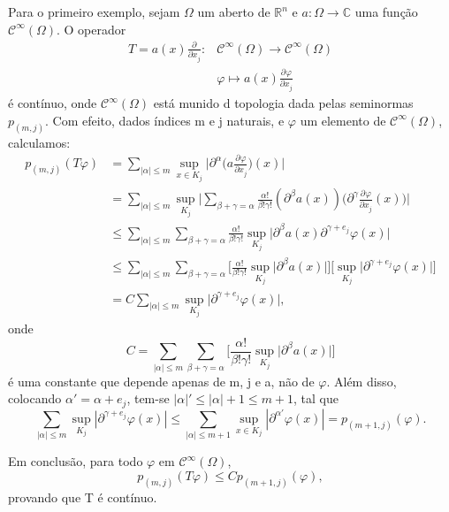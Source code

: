 \documentclass[../distribution_theory_notes.tex]{subfiles}
\begin{document}
\begin{example}
	Para o primeiro exemplo, sejam \(\Omega \) um aberto de \(\mathbb{R}^{n}\) e \(a:\Omega \rightarrow \mathbb{C}\) uma função \(\mathcal{C}^{\infty}(\Omega )\). O operador
	\begin{align*}
		T=a(x)\frac{\partial^{}}{\partial x_{j}^{}}: & \mathcal{C}^{\infty}(\Omega )\rightarrow \mathcal{C}^{\infty}(\Omega ) \\
		                                             & \varphi \mapsto a(x)\frac{\partial^{}\varphi }{\partial x_{j}^{}}
	\end{align*}
	é contínuo, onde \(\mathcal{C}^{\infty}(\Omega )\) está munido d topologia dada pelas seminormas \(p_{(m, j)}.\) Com efeito, dados índices m e j naturais, e \(\varphi \) um elemento de \(\mathcal{C}^{\infty}(\Omega )\), calculamos:
	\begin{align*}
		p_{(m, j)}(T\varphi ) & =\sum\limits_{|\alpha |\leq m}^{}\sup_{x\in K_{j}} \biggl\vert \partial^{\alpha }\biggl(a \frac{\partial^{}\varphi }{\partial x_{j}^{}}\biggr)(x) \biggr\vert                                                                                                  \\
		                      & =\sum\limits_{|\alpha |\leq m}^{}\sup_{K_{j}}\biggl\vert \sum\limits_{\beta+\gamma =\alpha }^{} \frac{\alpha!}{\beta!\gamma!}(\partial^{\beta }a(x))\biggl(\partial^{\gamma }\frac{\partial^{}\varphi }{\partial x_{j}^{}}(x)\biggr)\biggr\vert                \\
		                      & \leq \sum\limits_{|\alpha |\leq m}^{}\sum\limits_{\beta +\gamma =\alpha }^{}\frac{\alpha!}{\beta!\gamma!}\sup_{K_{j}}\biggl\vert \partial^{\beta }a(x)\partial^{\gamma +e_{j}}\varphi(x) \biggr\vert                                                           \\
		                      & \leq \sum\limits_{|\alpha |\leq m}^{}\sum\limits_{\beta +\gamma =\alpha }^{}\biggl[\frac{\alpha!}{\beta!\gamma!}\sup_{K_{j}}\bigl\vert \partial^{\beta }a(x)\bigr\vert\biggr]\biggl[\sup_{K_{j}}\bigr\vert\partial^{\gamma +e_{j}}\varphi(x) \bigr\vert\biggr] \\
		                      & = C \sum\limits_{|\alpha |\leq m}^{} \sup_{K_{j}}\biggl\vert \partial^{\gamma +e_{j}}\varphi (x) \biggr\vert,
	\end{align*}
	onde
	\[
		C=\sum\limits_{|\alpha |\leq m}^{}\sum\limits_{\beta +\gamma =\alpha }^{}\biggl[\frac{\alpha!}{\beta!\gamma!}\sup_{K_{j}}\bigl\vert \partial^{\beta }a(x)\bigr\vert\biggr]
	\]
	é uma constante que depende apenas de m, j e a, não de \(\varphi \). Além disso, colocando \(\alpha '= \alpha +e_{j}\), tem-se \(|\alpha |'\leq |\alpha |+1 \leq m+1\), tal que
	\[
		\sum\limits_{|\alpha |\leq m}^{}\sup_{K_{j}}|\partial^{\gamma +e_{j}}\varphi (x)|\leq \sum\limits_{|\alpha |\leq m+1}^{}\sup_{x\in K_{j}}|\partial^{\alpha '}\varphi (x)|=p_{(m+1, j)}(\varphi ).
	\]

	Em conclusão, para todo \(\varphi \) em \(\mathcal{C}^{\infty}(\Omega )\),
	\[
		p_{(m, j)}(T\varphi )\leq Cp_{(m+1, j)}(\varphi ),
	\]
	provando que T é contínuo.
\end{example}
\end{document}
